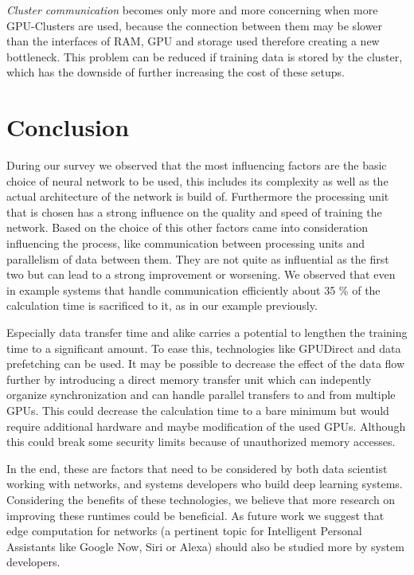 \documentclass[conference]{IEEEtran}
\begin{document}
\emph{Cluster communication} becomes only more and more concerning when more GPU-Clusters are used, because the connection between them may be slower than the interfaces of RAM, GPU and storage used therefore creating a new bottleneck. This problem can be reduced if training data is stored by the cluster, which has the downside of further increasing the cost of these setups.




\section{Conclusion}
During our survey we observed that the most influencing factors are the basic choice of neural network to be used, this includes its complexity as well as the actual architecture of the network is build of. Furthermore the processing unit that is chosen has a strong influence on the quality and speed of training the network. Based on the choice of this other factors came into consideration influencing the process, like communication between processing units and parallelism of data between them. They are not quite as influential as the first two but can lead to a strong improvement or worsening. We observed that even in example systems that handle communication efficiently about 35 \% of the calculation time is sacrificed to it, as in our example previously.

Especially data transfer time and alike carries a potential to lengthen the training time to a significant amount. To ease this, technologies like GPUDirect\cite{nvidiagpudirect2017} and data prefetching\cite{yang2010gpgpu} can be used. It may be possible to decrease the effect of the data flow further by introducing a direct memory transfer unit which can indepently organize synchronization and can handle parallel transfers to and from multiple GPUs. This could decrease the calculation time to a bare minimum but would require additional hardware and maybe modification of the used GPUs. Although this could break some security limits because of unauthorized memory accesses. 

In the end, these are factors that need to be considered by both data scientist working with networks, and systems developers who build deep learning systems. Considering the benefits of these technologies, we believe that more research on improving these runtimes could be beneficial. As future work we suggest that edge computation for networks (a pertinent topic for Intelligent Personal Assistants like Google Now, Siri or Alexa) should also be studied more by system developers.
\end{document}
